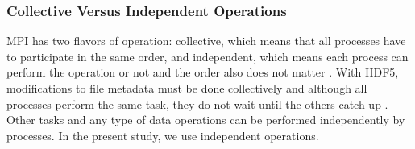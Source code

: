 \subsubsection{Collective Versus Independent Operations} 
MPI has two flavors of operation: collective, which means that all processes have to participate in the same order, and independent, which means each process can perform the operation or not and the order also does not matter  \cite{pythonhdf5}.
With HDF5, modifications to file metadata must be done collectively and although all processes perform the same task, they do not wait until the others catch up \cite{pythonhdf5}. 
Other tasks and any type of data operations can be performed independently by processes.
In the present study, we use independent operations.
